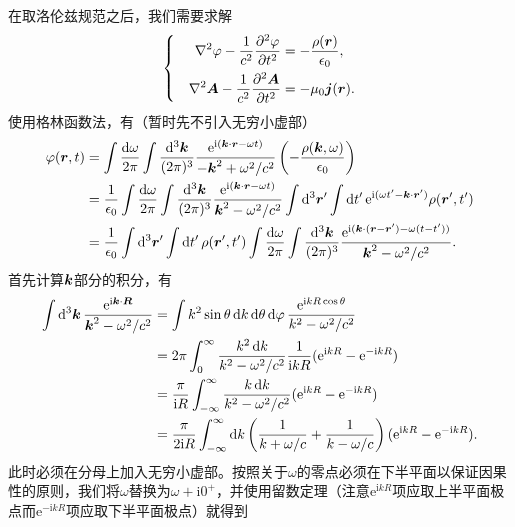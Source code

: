 \documentclass[UTF8, a4paper]{ctexart}
\newcommand*{\ee}{\mathrm{e}}
\newcommand*{\ii}{\mathrm{i}}
\newenvironment{bigcase}{\left\{\quad\begin{aligned}}{\end{aligned}\right.}
\begin{document}
在取洛伦兹规范之后，我们需要求解
\begin{equation}
    \begin{bigcase}
        \laplacian{\varphi} - \frac{1}{c^2} \pdv[2]{\varphi}{t} &= - \frac{\rho(\vb*{r})}{\epsilon_0}, \\
        \laplacian{\vb*{A}} - \frac{1}{c^2} \pdv[2]{\vb*{A}}{t} &= - \mu_0 \vb*{j}(\vb*{r}).
    \end{bigcase}
\end{equation}
使用格林函数法，有（暂时先不引入无穷小虚部）
\[
    \begin{aligned}
        \varphi(\vb*{r}, t) &= \int \frac{\dd{\omega}}{2\pi} \int \frac{\dd[3]{\vb*{k}}}{(2\pi)^3} \frac{\ee^{\ii (\vb*{k} \cdot \vb*{r} - \omega t)}}{- \vb*{k}^2 + \omega^2/c^2} \left( - \frac{\rho(\vb*{k}, \omega)}{\epsilon_0} \right) \\
        &= \frac{1}{\epsilon_0} \int \frac{\dd{\omega}}{2\pi} \int \frac{\dd[3]{\vb*{k}}}{(2\pi)^3} \frac{\ee^{\ii (\vb*{k} \cdot \vb*{r} - \omega t)}}{\vb*{k}^2 - \omega^2/c^2} \int \dd[3]{\vb*{r}'} \int \dd{t'} \ee^{\ii (\omega t' - \vb*{k} \cdot \vb*{r}')} \rho(\vb*{r}', t') \\
        &= \frac{1}{\epsilon_0} \int \dd[3]{\vb*{r}'} \int \dd{t'} \rho(\vb*{r}', t') \int \frac{\dd{\omega}}{2\pi} \int \frac{\dd[3]{\vb*{k}}}{(2\pi)^3} \frac{\ee^{\ii (\vb*{k} \cdot (\vb*{r} - \vb*{r}') - \omega (t - t'))}}{\vb*{k}^2 - \omega^2/c^2}.
    \end{aligned}
\]
首先计算$\vb*{k}$部分的积分，有
\[
    \begin{aligned}
        \int \dd[3]{\vb*{k}} \frac{\ee^{\ii \vb*{k} \cdot \vb*{R}}}{\vb*{k}^2 - \omega^2/c^2} &= \int k^2 \sin \theta \dd{k} \dd{\theta} \dd{\varphi} \frac{\ee^{\ii k R \cos \theta}}{k^2 - \omega^2 / c^2} \\
        &= 2\pi \int_0^\infty \frac{k^2 \dd{k}}{k^2 - \omega^2 / c^2} \frac{1}{\ii k R} (\ee^{\ii k R} - \ee^{-\ii k R}) \\
        &= \frac{\pi}{\ii R} \int_{-\infty}^\infty \frac{k \dd{k}}{k^2 - \omega^2 / c^2} (\ee^{\ii k R} - \ee^{-\ii k R}) \\
        &= \frac{\pi}{2 \ii R} \int_{-\infty}^\infty \dd{k} \left( \frac{1}{k + \omega / c} + \frac{1}{k - \omega / c} \right) (\ee^{\ii k R} - \ee^{-\ii k R}).
    \end{aligned}
\]
此时必须在分母上加入无穷小虚部。按照关于$\omega$的零点必须在下半平面以保证因果性的原则，我们将$\omega$替换为$\omega + \ii 0^+$，并使用留数定理（注意$\ee^{\ii k R}$项应取上半平面极点而$\ee^{- \ii k R}$项应取下半平面极点）就得到
\end{document}
